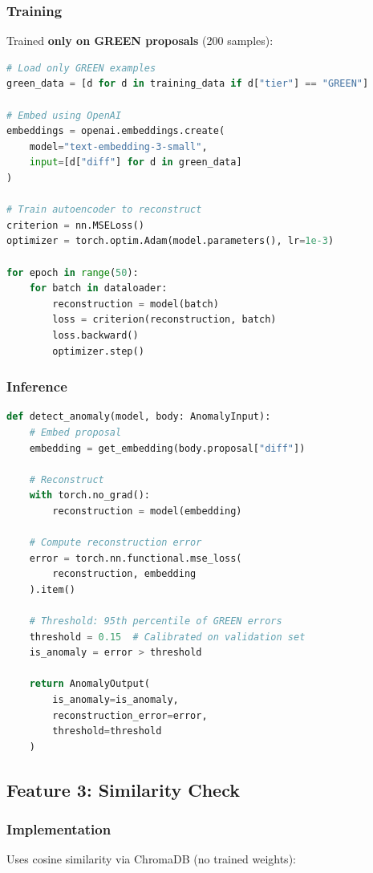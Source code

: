 \documentclass[11pt,a4paper]{article}
\begin{document}
\newpage
\subsubsection{Training}
Trained \textbf{only on GREEN proposals} (200 samples):

\begin{lstlisting}[language=Python,caption=Autoencoder Training (train\_autoencoder.py)]
# Load only GREEN examples
green_data = [d for d in training_data if d["tier"] == "GREEN"]

# Embed using OpenAI
embeddings = openai.embeddings.create(
    model="text-embedding-3-small",
    input=[d["diff"] for d in green_data]
)

# Train autoencoder to reconstruct
criterion = nn.MSELoss()
optimizer = torch.optim.Adam(model.parameters(), lr=1e-3)

for epoch in range(50):
    for batch in dataloader:
        reconstruction = model(batch)
        loss = criterion(reconstruction, batch)
        loss.backward()
        optimizer.step()
\end{lstlisting}

\subsubsection{Inference}
\begin{lstlisting}[language=Python,caption=Anomaly Detection]
def detect_anomaly(model, body: AnomalyInput):
    # Embed proposal
    embedding = get_embedding(body.proposal["diff"])
    
    # Reconstruct
    with torch.no_grad():
        reconstruction = model(embedding)
    
    # Compute reconstruction error
    error = torch.nn.functional.mse_loss(
        reconstruction, embedding
    ).item()
    
    # Threshold: 95th percentile of GREEN errors
    threshold = 0.15  # Calibrated on validation set
    is_anomaly = error > threshold
    
    return AnomalyOutput(
        is_anomaly=is_anomaly,
        reconstruction_error=error,
        threshold=threshold
    )
\end{lstlisting}

\newpage
\subsection{Feature 3: Similarity Check}

\subsubsection{Implementation}
Uses cosine similarity via ChromaDB (no trained weights):
\end{document}
